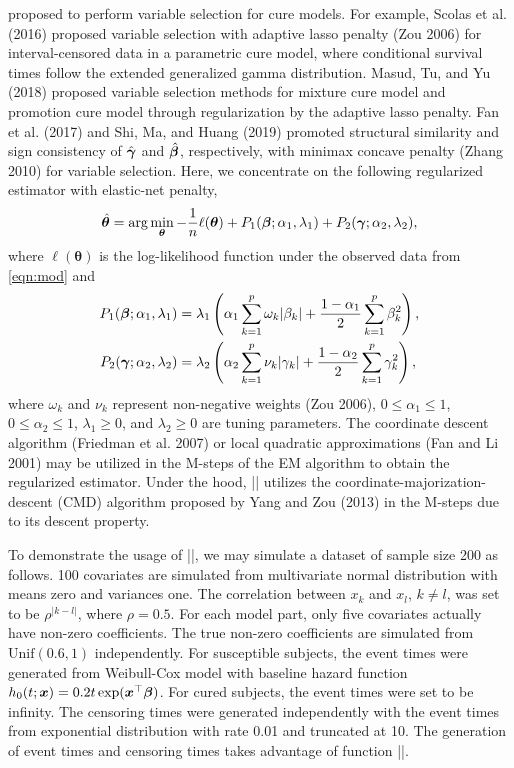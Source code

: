 proposed to perform variable selection for cure models. For example,
Scolas et al. (2016) proposed variable selection with adaptive lasso
penalty (Zou 2006) for interval-censored data in a parametric cure
model, where conditional survival times follow the extended generalized
gamma distribution. Masud, Tu, and Yu (2018) proposed variable selection
methods for mixture cure model and promotion cure model through
regularization by the adaptive lasso penalty. Fan et al. (2017) and Shi,
Ma, and Huang (2019) promoted structural similarity and sign consistency
of \(\hat{\bm{\gamma}}\) and \(\hat{\bm{\beta}}\), respectively, with minimax concave
penalty (Zhang 2010) for variable selection. Here, we concentrate on the
following regularized estimator with elastic-net penalty, \begin{align}
  \hat{\bm{\theta}} = \arg\min_{\bm{\theta}} -\frac{1}{n}
  \ell(\bm{\theta})
  + P_{1}(\bm{\beta}; \alpha_1, \lambda_1) + P_{2}(\bm{\gamma}; \alpha_2, \lambda_2),
\end{align} where \(\ell(\bm{\theta})\) is the log-likelihood function
under the observed data from \eqref{eqn:mod} and \begin{align*}
  P_{1}(\bm{\beta}; \alpha_1, \lambda_1)
  & = \lambda_1 \left( \alpha_1 \sum_{k=1}^{p} \omega_k \lvert \beta_k \rvert +
  \frac{1 - \alpha_1}{2} \sum_{k=1}^{p} \beta_k^2\right),\\
  P_{2}(\bm{\gamma}; \alpha_2, \lambda_2)
  & = \lambda_2 \left( \alpha_2 \sum_{k=1}^{p} \nu_k \lvert \gamma_k \rvert +
  \frac{1 - \alpha_2}{2} \sum_{k=1}^{p} \gamma_k^2 \right),
\end{align*} where \(\omega_k\) and \(\nu_k\) represent non-negative
weights (Zou 2006), \(0\le\alpha_1\le1\), \(0\le\alpha_2\le1\),
\(\lambda_1\ge0\), and \(\lambda_2\ge0\) are tuning parameters. The
coordinate descent algorithm (Friedman et al. 2007) or local quadratic
approximations (Fan and Li 2001) may be utilized in the M-steps of the
EM algorithm to obtain the regularized estimator. Under the hood,
\VERB|\NormalTok{()}| utilizes the
coordinate-majorization-descent (CMD) algorithm proposed by Yang and Zou
(2013) in the M-steps due to its descent property.

To demonstrate the usage of
\VERB|\NormalTok{()}|, we may simulate a
dataset of sample size 200 as follows. 100 covariates are simulated from
multivariate normal distribution with means zero and variances one. The
correlation between \(x_k\) and \(x_l\), \(k\neq l\), was set to be
\(\rho^{\lvert k - l \rvert}\), where \(\rho = 0.5\). For each model
part, only five covariates actually have non-zero coefficients. The true
non-zero coefficients are simulated from \(\mathrm{Unif}(0.6, 1)\)
independently. For susceptible subjects, the event times were generated
from Weibull-Cox model with baseline hazard function
\(h_0(t; \bm{x}) = 0.2t\exp(\bm{x}^{\top}\bm{\beta})\). For cured subjects, the event
times were set to be infinity. The censoring times were generated
independently with the event times from exponential distribution with
rate 0.01 and truncated at 10. The generation of event times and
censoring times takes advantage of function
\VERB|\OperatorTok{::}\NormalTok{()}|.

